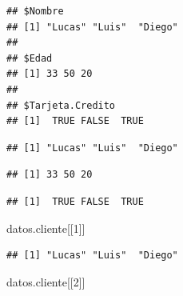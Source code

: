 \documentclass[
  12pt,
]{book}
\newenvironment{Shaded}{\begin{snugshade}}{\end{snugshade}}
\newcommand{\DecValTok}[1]{\textcolor[rgb]{0.00,0.00,0.81}{#1}}
\newcommand{\NormalTok}[1]{#1}
\newcommand{\SpecialCharTok}[1]{\textcolor[rgb]{0.00,0.00,0.00}{#1}}
\begin{document}
\begin{verbatim}
## $Nombre
## [1] "Lucas" "Luis"  "Diego"
## 
## $Edad
## [1] 33 50 20
## 
## $Tarjeta.Credito
## [1]  TRUE FALSE  TRUE
\end{verbatim}

\begin{Shaded}
\end{Shaded}

\begin{verbatim}
## [1] "Lucas" "Luis"  "Diego"
\end{verbatim}

\begin{Shaded}
\end{Shaded}

\begin{verbatim}
## [1] 33 50 20
\end{verbatim}

\begin{Shaded}
\end{Shaded}

\begin{verbatim}
## [1]  TRUE FALSE  TRUE
\end{verbatim}

\begin{Shaded}
\begin{Highlighting}[]
\NormalTok{datos.cliente[[}\DecValTok{1}\NormalTok{]]}
\end{Highlighting}
\end{Shaded}

\begin{verbatim}
## [1] "Lucas" "Luis"  "Diego"
\end{verbatim}

\begin{Shaded}
\begin{Highlighting}[]
\NormalTok{datos.cliente[[}\DecValTok{2}\NormalTok{]]}
\end{Highlighting}
\end{Shaded}
\end{document}
